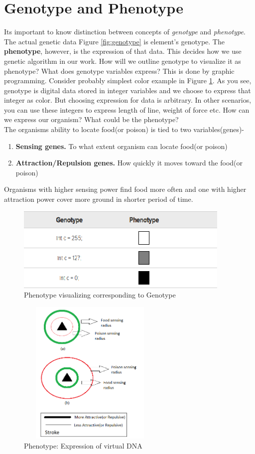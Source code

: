 \documentclass[conference]{IEEEtran}
\begin{document}
\section{Genotype and Phenotype}
Its important to know distinction between concepts of \textit{genotype} and \textit{phenotype}. The actual genetic data Figure \ref{fig:genotype} is element's genotype. The \textbf{phenotype}, however, is the expression of that data. This decides how we use genetic algorithm in our work. How will we outline genotype to visualize it as phenotype? What does genotype variables express? This is done by graphic programming. Consider probably simplest color example in Figure \ref{fig:genotype-and-phenotype}. As you see, genotype is digital data stored in integer variables and we choose to express that integer as color. But choosing expression for data is arbitrary. In other scenarios, you can use these integers to express length of line, weight of force etc. How can we express our organism? What could be the phenotype?\\
The organisms ability to locate food(or poison) is tied to two variables(genes)-
\begin{enumerate}
\item \textbf{Sensing genes.} To what extent organism can locate food(or poison)
\item \textbf{Attraction/Repulsion genes.} How quickly it moves toward the food(or poison)
\end{enumerate}
Organisms with higher sensing power find food more often and one with higher attraction power cover more ground in shorter period of time.
\begin{figure}
	\includegraphics[scale=1]{genotype-and-phenotype.png}
	\caption{Phenotype visualizing corresponding to Genotype}
	\label{fig:genotype-and-phenotype}
\end{figure}
\begin{figure}
	\includegraphics[height=7cm,width=7cm]{phenotype.png}
	\caption{Phenotype: Expression of virtual DNA}
	\label{fig:phenotype}
\end{figure}
\end{document}
